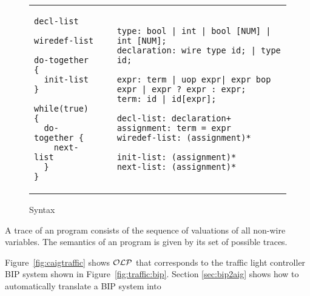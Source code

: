 \begin{figure*}
\begin{tabular}{p{3cm}p{0.5cm}p{10cm}}
\begin{lstlisting}
decl-list

wiredef-list

do-together {
  init-list 
}

while(true) {
  do-together {
    next-list
  } 
}
\end{lstlisting}
&
&
\begin{lstlisting}
type: bool | int | bool [NUM] | int [NUM]; 
declaration: wire type id; | type id;

expr: term | uop expr| expr bop expr | expr ? expr : expr;
term: id | id[expr]; 

decl-list: declaration+
assignment: term = expr
wiredef-list: (assignment)*

init-list: (assignment)* 
next-list: (assignment)* 
\end{lstlisting}
\end{tabular}
\caption{\caig Syntax}
\label{fig:gr}
\end{figure*}


\begin{definition}
A trace of an \caig program consists of the sequence of valuations of all non-wire variables. The semantics of an \caig program is given by its set of possible traces.  
\end{definition}

\begin{example}
Figure~\ref{fig:caigtraffic} shows $\mathcal{OLP}$ that corresponds to the traffic light controller BIP system shown in Figure~\ref{fig:traffic:bip}. Section \ref{sec:bip2aig} shows how to automatically translate a BIP system into \caig

\end{example}